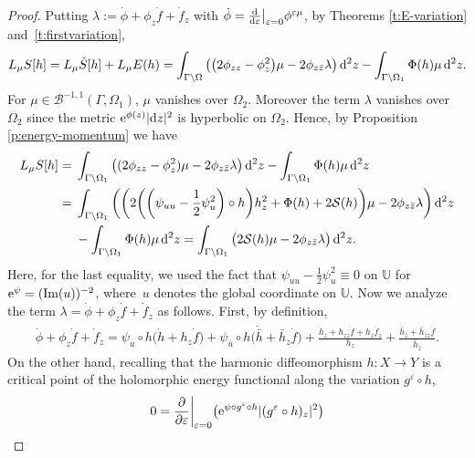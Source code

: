 \documentclass[10pt,a4paper]{amsart}
\numberwithin{equation}{section}
\newcommand{\vep}{\varepsilon}
\begin{document}
\begin{proof}
Putting $\lambda:=\dot{\phi}+\phi_z \dot{f} +\dot{f}_z$ with $\dot{\phi}=\frac{\rm d}{{\rm d}\vep}\big|_{\vep=0} \phi^{\vep\mu}$,
by Theorems \ref{t:E-variation} and~\ref{t:firstvariation},
\begin{gather*}
L_{\mu} S[h]= L_{\mu} \check{S}[h] +L_{\mu} E(h)
= \int_{\Gamma\backslash\Omega} \big(\big(2\phi_{zz}-\phi^2_z\big)\mu -2\phi_{z\bar{z}} \lambda\big)\, {\rm d}^2z -\int_{\Gamma\backslash\Omega_1} \Phi(h) \mu\, {\rm d}^2z.
\end{gather*}
For $\mu\in \mathcal{B}^{-1,1}(\Gamma,\Omega_1)$, $\mu$ vanishes over $\Omega_2$. Moreover the term $\lambda$ vanishes over $\Omega_2$ since the metric ${\rm e}^{\phi(z)}|{\rm d}z|^2$ is hyperbolic on $\Omega_2$. Hence, by Proposition \ref{p:energy-momentum} we have
\begin{align*}
L_{\mu} S[h]={}& \int_{\Gamma\backslash\Omega_1} \big((2\phi_{zz}-\phi^2_z)\mu -2\phi_{z\bar{z}} \lambda \big)\, {\rm d}^2z -\int_{\Gamma\backslash\Omega_1} \Phi(h) \mu\, {\rm d}^2z
\\
= {}&\int_{\Gamma\backslash\Omega_1} \bigg(\bigg(2\bigg(\bigg(\psi_{uu}-\frac12 \psi^2_u \bigg)\circ h\bigg) h_z^2+ \Phi(h) + 2\mathcal{S}(h) \bigg) \mu - 2\phi_{z\bar{z}}\lambda \bigg) \, {\rm d}^2z
\\
&-\int_{\Gamma\backslash\Omega_1} \Phi(h) \mu\, {\rm d}^2z
= \int_{\Gamma\backslash\Omega_1} \big( 2\mathcal{S}(h)\mu - 2\phi_{z\bar{z}}\lambda \big) \, {\rm d}^2z.
\end{align*}
Here, for the last equality, we used the fact that $\psi_{uu}-\frac12 \psi^2_u \equiv 0$ on $\mathbb{U}$ for ${\rm e}^\psi= (\mathrm{Im}(u))^{-2}$, where~$u$ denotes the global coordinate on $\mathbb{U}$.
Now we analyze the term $\lambda=\dot{\phi} +\phi_z \dot{f} + \dot{f}_z$ as follows. First, by definition,
\begin{gather}\label{e:lambda-var}
\dot{\phi}+\phi_z\dot{f}+\dot{f}_z = \psi_u\circ h \big(\dot{h}\!+h_z \dot{f} \big) +\psi_{\bar{u}} \circ h \big(\dot{\bar{h}}\!+ \bar{h}_z \dot{f}\big)
 + \frac{\dot{h}_z\!+h_{zz}\dot{f} \!+h_z \dot{f}_z}{ h_z}+ \frac{\dot{\bar{h}}_{\bar{z}}\!+\bar{h}_{\bar{z}z}\dot{f}}{ \bar{h}_{\bar{z}}}.
\end{gather}
On the other hand, recalling that the harmonic diffeomorphism $h\colon X\to Y$ is a critical point of the holomorphic energy functional along the variation $g^\vep \circ h$,
\begin{gather*}
0=\frac{\partial}{\partial\vep}\bigg|_{\vep=0} \big({\rm e}^{\psi\circ g^\vep \circ h} |(g^\vep \circ h)_z|^2 \big)

\end{gather*}
\end{proof}
\end{document}
